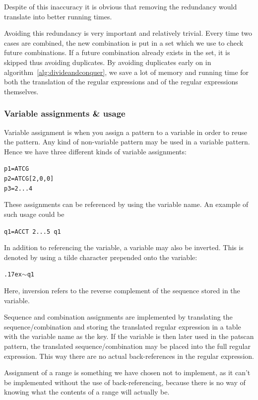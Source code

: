 \documentclass[12pt]{article}
\theoremstyle{definition}
\begin{document}
Despite of this inaccuracy it is obvious that removing the redundancy would translate into better running times.

Avoiding this redundancy is very important and relatively trivial. Every time two cases are combined, the new combination is put in a set which we use to check future combinations. If a future combination already exists in the set, it is skipped thus avoiding duplicates. By avoiding duplicates early on in algorithm~\ref{alg:divideandconquer}, we save a lot of memory and running time for both the translation of the regular expressions and of the regular expressions themselves.

\subsubsection{Variable assignments \& usage}

Variable assignment is when you assign a pattern to a variable in order to reuse the pattern. Any kind of non-variable pattern may be used in a variable pattern. Hence we have three different kinds of variable assignments:

\texttt{p1=ATCG} \\
\texttt{p2=ATCG[2,0,0]} \\
\texttt{p3=2...4}

These assignments can be referenced by using the variable name. An example of such usage could be

\texttt{q1=ACCT 2...5 q1}

In addition to referencing the variable, a variable may also be inverted. This is denoted by using a tilde character prepended onto the variable:

\texttt{{\raise.17ex\hbox{$\scriptstyle\mathtt{\sim}$}}q1}

Here, inversion refers to the reverse complement of the sequence stored in the variable.

Sequence and combination assignments are implemented by translating the sequence/combination and storing the translated regular expression in a table with the variable name as the key. If the variable is then later used in the patscan pattern, the translated sequence/combination may be placed into the full regular expression. This way there are no actual back-references in the regular expression.

Assignment of a range is something we have chosen not to implement, as it can't be implemented without the use of back-referencing, because there is no way of knowing what the contents of a range will actually be.
\end{document}
